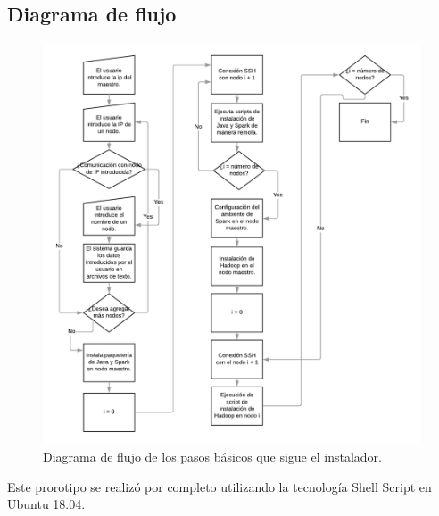 \subsection{Diagrama de flujo}
\begin{figure}[H]
	\hypertarget{fig:diagramaFlujo}{\hspace{1pt}}
	\begin{center}
		\includegraphics{capitulo5/images/diagramaFlujo.png}
		\caption{Diagrama de flujo de los pasos básicos que sigue el instalador.}
	\end{center}
\end{figure}

Este prorotipo se realizó por completo utilizando la tecnología Shell Script en Ubuntu 18.04.\\

